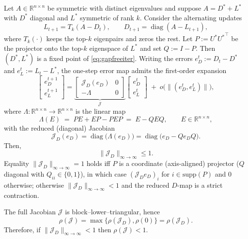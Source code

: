 \documentclass[final,hidelinks,onefignum,onetabnum]{siamart250211}
\providecommand{\1}{\mathbf{1}}
\theoremstyle{plain}
\begin{document}
\begin{theorem}\label{thm:gapfree}
Let $A\in\mathbb{R}^{n\times n}$ be symmetric with distinct eigenvalues and suppose $A=D^*+L^*$ with $D^*$ diagonal and $L^*$ symmetric of rank $k$.
Consider the alternating updates
\begin{equation} \label{eq:gapfreeiter}
    L_{t+1}=T_k(A-D_t),\qquad
    D_{t+1}=\operatorname{diag}(A-L_{t+1}),
\end{equation}
where $T_k(\cdot)$ keeps the top-$k$ eigenpairs and zeros the rest.
Let $P:=U^*{U^*}^\top$ be the projector onto the top-$k$ eigenspace of $L^*$ and set $Q:=I-P$.
Then $(D^*,L^*)$ is a fixed point of \eqref{eq:gapfreeiter}. Writing the errors $e_D^t:=D_t-D^*$ and $e_L^t:=L_t-L^*$, the one-step error map admits the first-order expansion
\[
\begin{bmatrix} e_D^{t+1} \\[2pt] e_L^{t+1} \end{bmatrix}
=
\underbrace{\begin{bmatrix}
\mathcal{J}_D(e_D) & 0\\[2pt]
-\Lambda & 0
\end{bmatrix}}_{\displaystyle \mathcal{J}}
\begin{bmatrix} e_D^{t} \\[2pt] e_L^{t} \end{bmatrix}
\;+\;o\!\big(\|(e_D^{t},e_L^{t})\|\big),
\]
where $\Lambda:\mathbb{R}^{n\times n}\to\mathbb{R}^{n\times n}$ is the linear map
\[
\Lambda(E)\;=\;PE+EP-PEP\;=\;E-QEQ,
\qquad E\in\mathbb{R}^{n\times n},
\]
with the reduced (diagonal) Jacobian
\[
\mathcal{J}_D(e_D)=\operatorname{diag}\big(\Lambda(e_D)\big)
=\operatorname{diag}\big(e_D-Qe_DQ\big).
\]
Then,
\[
\|\mathcal{J}_D\|_{\infty\to\infty}\le 1.
\]
Equality $\|\mathcal{J}_D\|_{\infty\to\infty}=1$ holds iff $P$ is a coordinate (axis-aligned) projector
($Q$ diagonal with $Q_{ii}\in\{0,1\}$), in which case
$(\mathcal{J}_D e_D)_i$ for $i\in\mathrm{supp}(P)$ and $0$ otherwise; otherwise
$\|\mathcal{J}_D\|_{\infty\to\infty}<1$ and the reduced $D$-map is a strict contraction.

\medskip
The full Jacobian $\mathcal{J}$ is block–lower–triangular, hence
\[
\rho(\mathcal{J})=\max\{\rho(\mathcal{J}_D),\rho(0)\}=\rho(\mathcal{J}_D).
\]
Therefore, if $\|\mathcal{J}_D\|_{\infty\to\infty}<1$ then $\rho(\mathcal{J})<1$.
\end{theorem}
\end{document}
